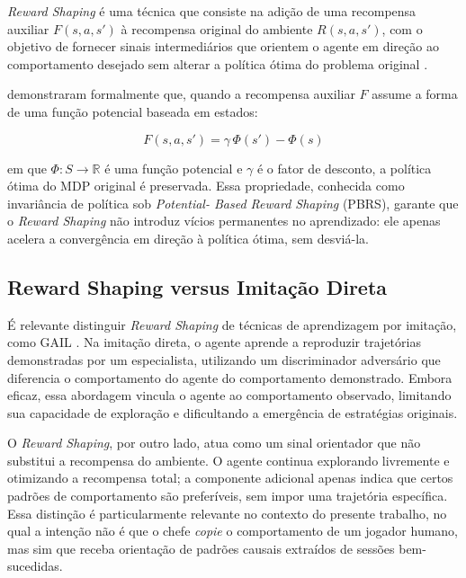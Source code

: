 \textit{Reward Shaping} é uma técnica que consiste na adição de uma
recompensa auxiliar $F(s, a, s')$ à recompensa original do ambiente $R(s, a,
s')$, com o objetivo de fornecer sinais intermediários que orientem o agente
em direção ao comportamento desejado sem alterar a política ótima do problema
original \cite{ng1999reward}.

 demonstraram formalmente que, quando a recompensa
auxiliar $F$ assume a forma de uma função potencial baseada em estados:

\begin{equation}
    F(s, a, s') = \gamma \, \Phi(s') - \Phi(s)
    \label{eq:pbrs}
\end{equation}

\noindent em que $\Phi: S \rightarrow \mathbb{R}$ é uma função potencial e
$\gamma$ é o fator de desconto, a política ótima do MDP original é preservada.
Essa propriedade, conhecida como invariância de política sob \textit{Potential-
Based Reward Shaping} (PBRS), garante que o \textit{Reward Shaping} não
introduz vícios permanentes no aprendizado: ele apenas acelera a convergência
em direção à política ótima, sem desviá-la.

\subsection{Reward Shaping versus Imitação Direta}
\label{subsec:shaping-vs-imitacao}

É relevante distinguir \textit{Reward Shaping} de técnicas de aprendizagem
por imitação, como GAIL \cite{ho2016gail}. Na imitação direta, o agente
aprende a reproduzir trajetórias demonstradas por um especialista, utilizando
um discriminador adversário que diferencia o comportamento do agente do
comportamento demonstrado. Embora eficaz, essa abordagem vincula o agente ao
comportamento observado, limitando sua capacidade de exploração e dificultando
a emergência de estratégias originais.

O \textit{Reward Shaping}, por outro lado, atua como um sinal orientador que
não substitui a recompensa do ambiente. O agente continua explorando
livremente e otimizando a recompensa total; a componente adicional apenas
indica que certos padrões de comportamento são preferíveis, sem impor uma
trajetória específica. Essa distinção é particularmente relevante no contexto
do presente trabalho, no qual a intenção não é que o chefe \textit{copie} o
comportamento de um jogador humano, mas sim que receba orientação de padrões
causais extraídos de sessões bem-sucedidas.

